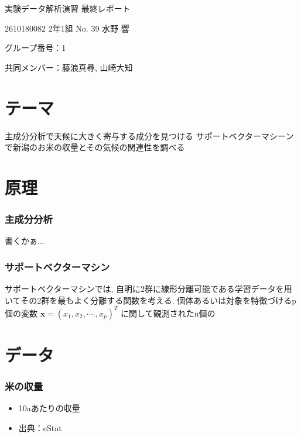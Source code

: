 \documentclass[
]{article}
\date{}
\begin{document}
実験データ解析演習 最終レポート

2610180082 2年1組 No. 39 水野 響

グループ番号：1

共同メンバー：藤浪真尋, 山崎大知

\hypertarget{header-n2003}{%
\section{テーマ}\label{header-n2003}}

主成分分析で天候に大きく寄与する成分を見つける
サポートベクターマシーンで新潟のお米の収量とその気候の関連性を調べる

\hypertarget{header-n2005}{%
\section{原理}\label{header-n2005}}

\hypertarget{header-n2006}{%
\subsubsection{主成分分析}\label{header-n2006}}

書くかぁ...

\hypertarget{header-n2009}{%
\subsubsection{サポートベクターマシン}\label{header-n2009}}

サポートベクターマシンでは,
自明に2群に線形分離可能である学習データを用いてその2群を最もよく分離する関数を考える.
個体あるいは対象を特徴づけるp個の変数
\(\textbf{x} = (x_1, x_2, \cdots., x_p)^T\) に関して観測されたn個の

\hypertarget{header-n2013}{%
\section{データ}\label{header-n2013}}

\hypertarget{header-n2014}{%
\subsubsection{米の収量}\label{header-n2014}}

\begin{itemize}
\item
  10aあたりの収量
\item
  出典：eStat
\end{itemize}
\end{document}
